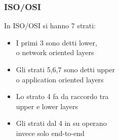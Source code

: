 \documentclass[aspectratio=169]{beamer}
\begin{document}
    \begin{frame}
        \frametitle{ISO/OSI}
        In ISO/OSI si hanno 7 strati:
        \begin{itemize}
            \item I primi 3 sono detti lower,\\o network oriented layers
            \item Gli strati 5,6,7 sono detti upper\\o application oriented layers
            \item Lo strato 4 fa da raccordo tra\\upper e lower layers
            \item Gli strati dal 4 in su operano\\invece solo end-to-end
        \end{itemize}
    \end{frame}
    
\end{document}
